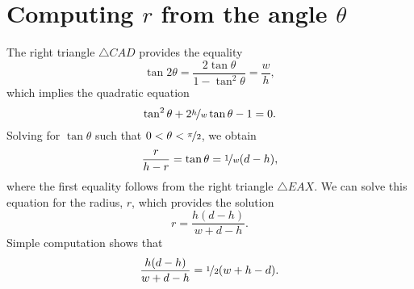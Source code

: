 \appendix

\newcommand*{\bbU}{\mathbb{U}}

\section{Computing $r$ from the angle $\theta$}

The right triangle $\triangle CAD$ provides the equality \[ \tan{2\theta} =
\frac{2\tan{\theta}}{1-\tan^2{\theta}} = \frac{w}{h}, \] which implies the
quadratic equation \[ \tan^2{\theta} + 2\nicefrac{h}{w}\tan{\theta} - 1 = 0. \]
Solving for $\tan{\theta}$ such that $0 < \theta < \nicefrac{\pi}{2}$, we obtain
\[ \frac{r}{h-r} = \tan{\theta} = \nicefrac{1}{w}(d-h), \] where the first 
equality follows from the right triangle $\triangle EAX$. We can solve this
equation for the radius, $r$, which provides the solution
%
\begin{equation}
  r = \frac{h(d-h)}{w+d-h}.
  \label{eq:radiusalt}
\end{equation}
%
Simple computation shows that 
\[ \frac{h(d-h)}{w+d-h} = \nicefrac{1}{2}(w+h-d). \]
